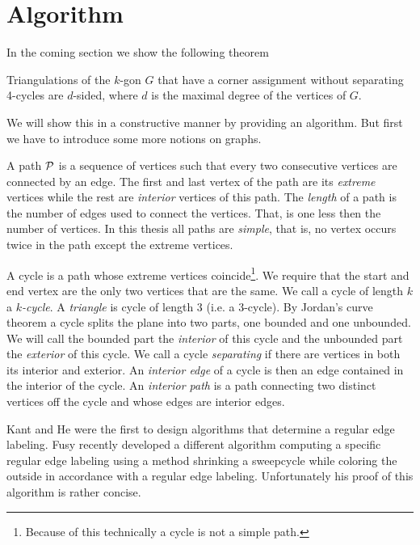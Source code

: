 
\section{Algorithm}
\thispagestyle{plain}
\label{s:algo}

In the coming section we show the following theorem

\begin{thrm}
  \label{th:dsided}
  Triangulations of the $k$-gon $G$ that have a corner assignment without separating 4-cycles are $d$-sided, where $d$ is the maximal degree of the vertices of $G$.
\end{thrm}

We will show this in a constructive manner by providing an algorithm. But first we have to introduce some more notions on graphs.

  A path $\P$ is a sequence of vertices such that every two consecutive vertices are connected by an edge. The first and last vertex of the path are its \emph{extreme} vertices while the rest are \emph{interior} vertices of this path. The \emph{length} of a path is the number of edges used to connect the vertices. That, is one less then the number of vertices. In this thesis all paths are \emph{simple}, that is, no vertex occurs twice in the path except the extreme vertices.

  A cycle is a path whose extreme vertices coincide\footnote{Because of this technically a cycle is not a simple path.}. We require that the start and end vertex are the only two vertices that are the same. We call a cycle of length $k$  a \emph{$k$-cycle}. A \emph{triangle} is cycle of length $3$ (i.e. a $3$-cycle). By Jordan's curve theorem a cycle splits the plane into two parts, one bounded and one unbounded. We will call the bounded part the \emph{interior} of this cycle and the unbounded part the \emph{exterior} of this cycle.
  We call a cycle \emph{separating} if there are vertices in both its interior and exterior.
  An \emph{interior edge} of a cycle is then an edge contained in the interior of the cycle.
  An \emph{interior path} is a path connecting two distinct vertices off the cycle and whose edges are interior edges.


  Kant and He \cite{Kant1997} were the first to design algorithms that determine a regular edge labeling. Fusy \cite{Fusy2006} recently developed a different algorithm computing a specific regular edge labeling using a method shrinking a sweepcycle while coloring the outside in accordance with a regular edge labeling. Unfortunately his proof of this algorithm is rather concise.

